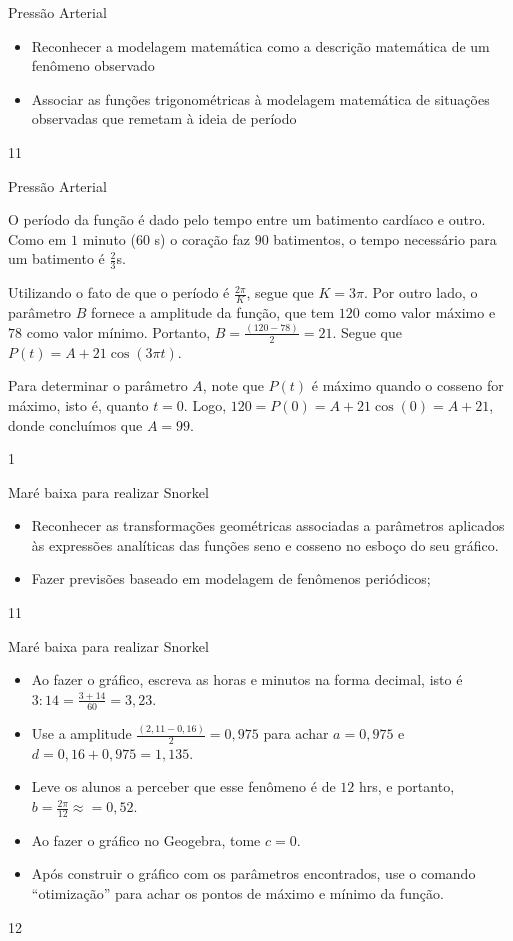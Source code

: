 \clearpage
\def\currentcolor{session2}
\marginpar{\vspace{.5em}}
\begin{objectives}{Pressão Arterial}
{
\begin{itemize}
\item Reconhecer a modelagem matemática como a descrição matemática de um fenômeno observado
\item Associar as funções trigonométricas à modelagem matemática de situações observadas que remetam à ideia de período
\end{itemize}
}{1}{1}
\end{objectives}
\marginpar{\vspace{-1em}}
\begin{answer}{Pressão Arterial}
{
O período da função é dado pelo tempo entre um batimento cardíaco e outro. Como em $1$ minuto ($60$ s) o coração faz $90$ batimentos, o tempo necessário para um batimento é $\frac{2}{3}$s. 

Utilizando o fato de que o período é $\frac{2\pi}{K}$, segue que $K = 3\pi$. Por outro lado, o parâmetro $B$ fornece a amplitude da função, que tem $120$ como valor máximo e $78$ como valor mínimo. Portanto, $B =\frac{(120-78)}{2} = 21$. Segue que $P(t) = A + 21\cos(3\pi t)$.

Para determinar o parâmetro $A$, note que $P(t)$ é máximo quando o cosseno for máximo, isto é, quanto $t = 0$. Logo, $120 = P(0) = A + 21\cos(0) = A + 21$, donde concluímos que $A = 99$.
}{1}
\end{answer}
\begin{objectives}{Maré baixa para realizar Snorkel}
{
\begin{itemize}
\item  Reconhecer as transformações geométricas associadas a
parâmetros aplicados às expressões analíticas das funções
seno e cosseno no esboço do seu gráfico.
\item Fazer previsões baseado em modelagem de fenômenos
periódicos;
\end{itemize}
}{1}{1}
\end{objectives}
\marginpar{\vspace{-1em}}
\begin{sugestions}{Maré baixa para realizar Snorkel}
{
\begin{itemize}
\item Ao fazer o gráfico, escreva as horas e minutos na forma decimal, isto é $3:14=\frac{3+14}{60}=3{,}23$.
\item Use a amplitude $\frac{(2{,}11-0{,}16)}{2}=0{,}975$ para achar $a=0{,}975$ e $d=0{,}16+0{,}975=1{,}135$.
\item Leve os alunos a perceber que esse fenômeno é de $12$ hrs, e
portanto, $b=\frac{2\pi}{12}\approx=0{,}52$.
\item Ao fazer o gráfico no Geogebra, tome $c=0$.
\item Após construir o gráfico com os parâmetros encontrados, use o comando “otimização”{} para achar os pontos de máximo e mínimo da função.
\end{itemize}
}{1}{2} 
\end{sugestions}
